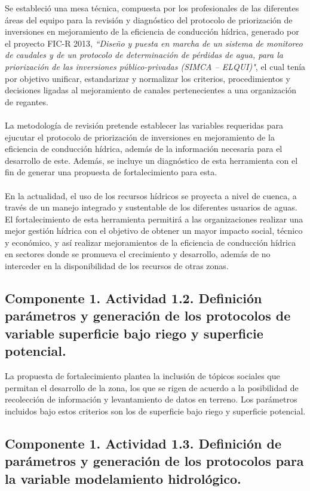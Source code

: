 \documentclass[]{article}
\begin{document}
Se estableció una mesa técnica, compuesta por los profesionales de las diferentes áreas del equipo para la revisión y diagnóstico del protocolo de priorización de inversiones en mejoramiento de la eficiencia de conducción hídrica, generado por el proyecto FIC-R 2013, \textit{``Diseño y puesta en marcha de un sistema de monitoreo de caudales y de un protocolo de determinación de pérdidas de agua, para la priorización de las inversiones público-privadas (SIMCA – ELQUI)"}, el cual tenía por objetivo unificar, estandarizar y normalizar los criterios, procedimientos y decisiones ligadas al mejoramiento de canales pertenecientes a una organización de regantes.\\
\\
La metodología de revisión pretende establecer las variables requeridas para ejucutar el protocolo de priorización de inversiones en mejoramiento de la eficiencia de conducción hídrica, además de la información necesaria para el desarrollo de este. Además, se incluye un diagnóstico de esta herramienta con el fin de generar una propuesta de fortalecimiento para esta.\\
\\
En la actualidad, el uso de los recursos hídricos se proyecta a nivel de cuenca, a través de un manejo integrado y sustentable de los diferentes usuarios de aguas. El fortalecimiento de esta herramienta permitirá a las organizaciones realizar una mejor gestión hídrica con el objetivo de obtener un mayor impacto social, técnico y económico, y así realizar mejoramientos de la eficiencia de conducción hídrica en sectores donde se promueva el crecimiento y desarrollo, además de no interceder en la disponibilidad de los recursos de otras zonas.

\subsection{Componente 1. Actividad 1.2. Definición parámetros y generación de los protocolos de variable superficie bajo riego y superficie potencial.}

La propuesta de fortalecimiento plantea la inclusión de tópicos sociales que permitan el desarrollo de la zona, los que se rigen de acuerdo a la posibilidad de recolección de información y levantamiento de datos en terreno. Los parámetros incluidos bajo estos criterios son los de superficie bajo riego y superficie potencial.

\subsection{Componente 1. Actividad 1.3. Definición de parámetros y generación de los protocolos para la variable modelamiento hidrológico.}
\end{document}
